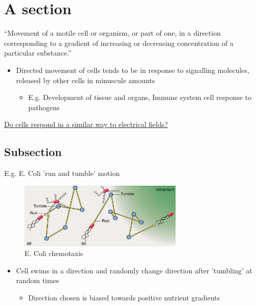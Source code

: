 \section{A section}

\begin{frame}{\insertsectionhead}
  
  ``Movement of a motile cell or organism, 
  or part of one, 
  in a direction corresponding to 
  a gradient of increasing or decreasing concentration 
  of a particular substance.''
  
  \vspace*{9pt}
  
  \begin{itemize}
    \item Directed movement of cells tends to be in response to 
    signalling molecules, 
    released by other cells in minuscule amounts
    \begin{itemize}
      \item E.g. 
      Development of tissue and organs, 
      Immune system cell response to pathogens
    \end{itemize}
  \end{itemize}
  
  \vspace*{9pt}
  
	\underline{Do cells respond in a similar way to electrical fields?}
  
\end{frame}


\subsection{Subsection}

\begin{frame}{\insertsubsectionhead}
  
  E.g. E. Coli 'run and tumble' motion

	\begin{figure}[h!]
    \includegraphics[width=0.7\textwidth]{src/img/example0}
		\caption{E. Coli chemotaxis}
  \end{figure}
  
	\begin{itemize}
    \item Cell swims in a direction and 
      randomly change direction after 
			'tumbling' at random times
		\begin{itemize}
      \item Direction chosen is biased towards 
        positive nutrient gradients
		\end{itemize}
	\end{itemize}

\end{frame}


